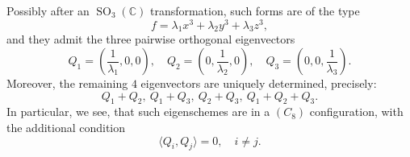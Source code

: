 \documentclass{amsart}
\theoremstyle{plain}
\theoremstyle{definition}
\newcommand{\C}{\mathbb{C}}
\newcommand{\SO}{\operatorname{SO}}
\begin{document}
Possibly after an $\SO_3(\C)$ transformation, such forms are of the type
$$
f=\lambda_1 x^3 +\lambda_2 y^3 + \lambda_3 z^3,
$$
and they admit the three pairwise orthogonal eigenvectors
$$
Q_1=(\frac{1}{\lambda_1},0,0), \quad 
Q_2=(0,\frac{1}{\lambda_2},0), \quad
Q_3=(0,0,\frac{1}{\lambda_3}).
$$
Moreover, the remaining $4$ eigenvectors are uniquely determined, precisely:
$$
Q_1+Q_2, \ Q_1+Q_3, \ Q_2+Q_3, \ Q_1+Q_2+Q_3.
$$
In particular, we see, that such eigenschemes are in a $(C_8)$ configuration, with the additional condition
$$
\langle Q_i,Q_j \rangle = 0, \quad i \neq j.
$$



\end{document}
